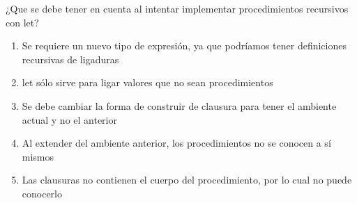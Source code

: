 {
  ¿Que se debe tener en cuenta al intentar implementar procedimientos recursivos con let?
  \begin{enumerate}
      \item Se requiere un nuevo tipo de expresión, ya que podríamos tener definiciones recursivas de ligaduras %
      \item let sólo sirve para ligar valores que no sean procedimientos
      \item Se debe cambiar la forma de construir de clausura para tener el ambiente actual y no el anterior
      \item Al extender del ambiente anterior, los procedimientos no se conocen a sí mismos %
      \item Las clausuras no contienen el cuerpo del procedimiento, por lo cual no puede conocerlo
  \end{enumerate}
}
